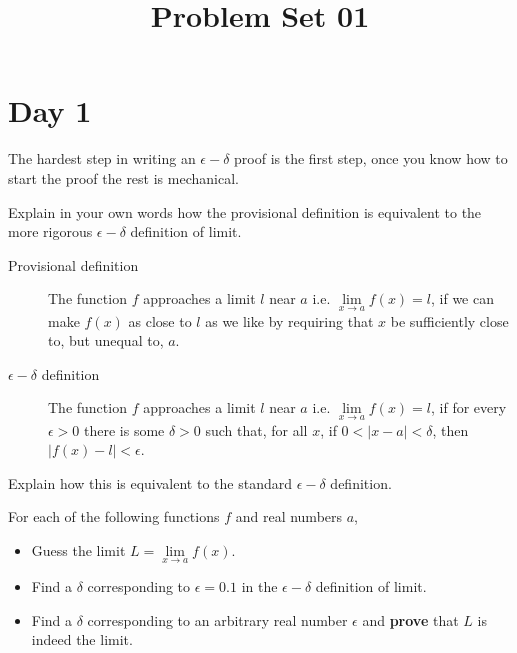 \documentclass[9pt, a4paper, oneside]{amsart}
\title{Problem Set 01}
\begin{document}
\maketitle
\thispagestyle{fancy}


\section*{Day 1}

The hardest step in writing an $ \epsilon-\delta$ proof is the first step, once you know how to start the proof the rest is mechanical. \\

\begin{questions}
	\item Explain in your own words how the provisional definition is equivalent to the more rigorous $\epsilon-\delta$ definition of limit.

	\begin{description}
		\item[Provisional definition] The function $f$ approaches a limit $l$ near $a$ i.e. $\lim \limits _ {x \rightarrow a} f(x) = l$, if we can make $f(x)$ as close to $l$ as we like by requiring that $x$ be sufficiently close to, but unequal to, $a$.
		\item[$\epsilon-\delta$ definition] The function $f$ {approaches a limit} $l$ near $a$ i.e. $\lim \limits _ {x \rightarrow a} f(x) = l$, if for every $\epsilon > 0$ there is some $\delta > 0$ such that, for all $x$, if $0 < |x - a| < \delta$, then $|f(x) - l| < \epsilon$.
	\end{description}

	Explain how this is equivalent to the standard $\epsilon-\delta$ definition.
	\item For each of the following functions $f$ and real numbers $a$,
	\begin{itemize}
		\item Guess the limit $L = \lim \limits _ {x \rightarrow a} f(x)$.
		\item Find a $\delta$ corresponding to $\epsilon = 0.1$ in the $\epsilon - \delta$ definition of limit.
		\item Find a $\delta$ corresponding to an arbitrary real number $\epsilon$ and \textbf{prove} that $L$ is indeed the limit.


\end{itemize}
\end{questions}
\end{document}
